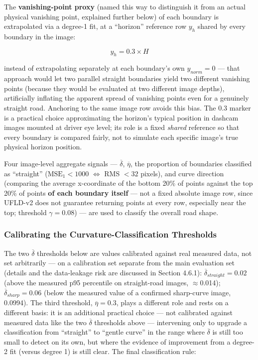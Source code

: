 \documentclass[12pt,a4paper]{report}
\begin{document}
The \textbf{vanishing-point proxy} (named this way to distinguish it from an actual physical vanishing point, explained further below) of each boundary is extrapolated via a degree-1 fit, at a ``horizon'' reference row $y_h$ shared by every boundary in the image:

\[
y_h = 0.3 \times H
\]

instead of extrapolating separately at each boundary's own $y_{norm}=0$ --- that approach would let two parallel straight boundaries yield two different vanishing points (because they would be evaluated at two different image depths), artificially inflating the apparent spread of vanishing points even for a genuinely straight road. Anchoring to the same image row avoids this bias. The 0.3 marker is a practical choice approximating the horizon's typical position in dashcam images mounted at driver eye level; its role is a fixed \textit{shared} reference so that every boundary is compared fairly, not to simulate each specific image's true physical horizon position.

Four image-level aggregate signals --- $\overline{\delta}$, $\overline{\eta}$, the proportion of boundaries classified as ``straight'' ($\text{MSE}_1 < 1000$ $\Leftrightarrow$ RMS $< 32$ pixels), and curve direction (comparing the average x-coordinate of the bottom 20\% of points against the top 20\% of points \textbf{of each boundary itself} --- not a fixed absolute image row, since UFLD-v2 does not guarantee returning points at every row, especially near the top; threshold $\gamma=0.08$) --- are used to classify the overall road shape.

\subsubsection*{Calibrating the Curvature-Classification Thresholds}

The two $\overline{\delta}$ thresholds below are values calibrated against real measured data, not set arbitrarily --- on a calibration set separate from the main evaluation set (details and the data-leakage risk are discussed in Section 4.6.1): $\overline{\delta}_{straight}=0.02$ (above the measured p95 percentile on straight-road images, $\approx$0.014); $\overline{\delta}_{sharp}=0.06$ (below the measured value of a confirmed sharp-curve image, 0.0994). The third threshold, $\overline{\eta}=0.3$, plays a different role and rests on a different basis: it is an additional practical choice --- not calibrated against measured data like the two $\overline{\delta}$ thresholds above --- intervening only to upgrade a classification from ``straight'' to ``gentle curve'' in the range where $\overline{\delta}$ is still too small to detect on its own, but where the evidence of improvement from a degree-2 fit (versus degree 1) is still clear. The final classification rule:
\end{document}
